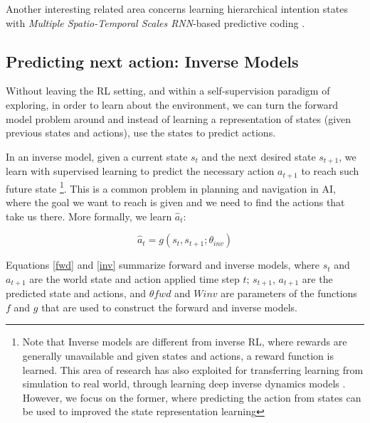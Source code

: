 \documentclass[a4paper]{article}
\begin{document}
Another interesting related area concerns learning hierarchical intention states with \textit{Multiple Spatio-Temporal Scales RNN}-based predictive coding \cite{Choi17,Ahmadi17}. %




\subsection{Predicting next action: Inverse Models}

Without leaving the RL setting, and within a self-supervision paradigm of exploring, in order to learn about the environment, we can turn the forward model problem around and instead of learning a representation of states (given previous states and actions), use the states to predict actions.

In an inverse model, given a current state $s_t$  and the next desired state $s_{t+1}$, we learn with supervised learning to predict the necessary action $a_{t+1}$ to reach such future state \footnote{Note that Inverse models are different from inverse RL, where rewards are generally unavailable and given states and actions, a reward function is learned. This area of research has also exploited for transferring learning from simulation to real world, through learning deep inverse dynamics models \cite{Christiano16}. However, we focus on the former, where predicting the action from states can be used to improved the state representation learning}. This is a common problem in planning and navigation in AI, where the goal we want to reach is given and we need to find the actions that take us there. More formally, we learn $\hat{a}_t$:

\begin{equation}
\hat{a}_t = g(s_t, s_{t+1}; \theta_{inv})
\label{inv}
\end{equation}

Equations \ref{fwd} and \ref{inv} summarize forward and inverse models, where $s_{t}$ and $a_{t+1}$ are the world state and action applied time step $t$; $s_{t+1}$, $a_{t+1}$ are the predicted state and actions, and $\theta fwd$ and $W inv$ are parameters of the functions $f$ and $g$ that are used to construct the forward and inverse models.
\end{document}
